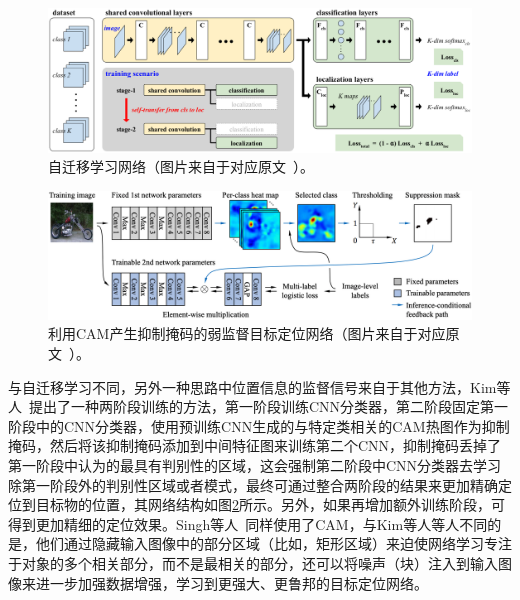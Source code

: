 \begin{figure}[h]
	\centering
	\includegraphics[width=1.0\textwidth]{figure/self_transfer_learning}
	\caption[自迁移学习网络]{自迁移学习网络（图片来自于对应原文~\cite{2015Hwang}）。} 
	\label{fig:self_transfer_learning}
\end{figure}
\begin{figure}[h]
	\centering
	\includegraphics[width=1.0\textwidth]{figure/cam_based_weakly_supervised_localization}
	\caption[利用CAM产生抑制掩码的弱监督目标定位网络]{利用CAM产生抑制掩码的弱监督目标定位网络（图片来自于对应原文~\cite{Krishna2018}）。}
	\label{fig:cam_based_weakly_supervised_localization}
\end{figure}

与自迁移学习不同，另外一种思路中位置信息的监督信号来自于其他方法，Kim等人~\cite{Kim_2017_ICCV}提出了一种两阶段训练的方法，第一阶段训练CNN分类器，第二阶段固定第一阶段中的CNN分类器，使用预训练CNN生成的与特定类相关的CAM热图作为抑制掩码，然后将该抑制掩码添加到中间特征图来训练第二个CNN，抑制掩码丢掉了第一阶段中认为的最具有判别性的区域，这会强制第二阶段中CNN分类器去学习除第一阶段外的判别性区域或者模式，最终可通过整合两阶段的结果来更加精确定位到目标物的位置，其网络结构如图\ref{fig:cam_based_weakly_supervised_localization}所示。另外，如果再增加额外训练阶段，可得到更加精细的定位效果。Singh等人~\cite{Krishna2018}同样使用了CAM，与Kim等人等人不同的是，他们通过隐藏输入图像中的部分区域（比如，矩形区域）来迫使网络学习专注于对象的多个相关部分，而不是最相关的部分，还可以将噪声（块）注入到输入图像来进一步加强数据增强，学习到更强大、更鲁邦的目标定位网络。

